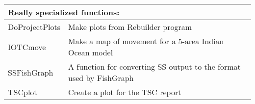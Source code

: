 \begin{center}
\begin{longtable}{p{4.5cm} p{10.52cm}}
		\hline
		\multicolumn{2}{l}{Really specialized functions:} \Tstrut\Bstrut\\
		\hline
		DoProjectPlots \Tstrut & Make plots from Rebuilder program \\
		IOTCmove       \Tstrut & Make a map of movement for a 5-area Indian Ocean model \\
		SSFishGraph    \Tstrut & A function for converting SS output to the format used by FishGraph \\
		TSCplot        \Tstrut & Create a plot for the TSC report \Bstrut\\
		\hline
	\end{longtable}
\end{center}

\pagebreak
